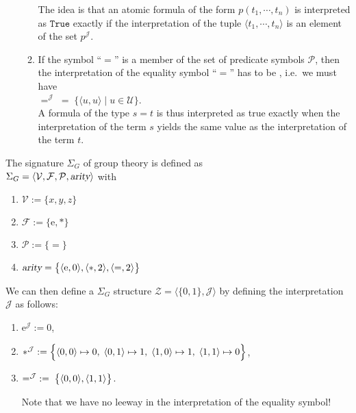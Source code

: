 \begin{Definition}[Structure]
\begin{enumerate}
\begin{enumerate}
              The idea is that an atomic formula of the form $p(t_1, \cdots, t_n)$
              is interpreted as $\texttt{True}$ exactly if the interpretation of the tuple
              $\langle t_1, \cdots, t_n \rangle$ is an element of the set $p^\mathcal{J}$.
        \item If the symbol ``$=$'' is a member of the set of predicate symbols $\mathcal{P}$, then the
              interpretation of  the equality symbol ``$=$'' has to be , i.e.~we must have
              \\[0.2cm]
              \hspace*{1.3cm}  
              $=^\mathcal{J} \;=\; \bigl\{ \langle u, u \rangle \mid u \in \mathcal{U} \bigr\}$.
              \\[0.2cm]
              A formula of the type $s = t$ is thus interpreted as true 
              exactly when the interpretation of the term $s$ yields the same value as the interpretation of
              the term $t$. 
              \eox
        \end{enumerate}
    \end{enumerate}
\end{Definition}

\exampleEng
The signature $\Sigma_G$ of group theory is defined as \\[0.2cm]
\hspace*{1.3cm} $\Sigma_G = \langle \mathcal{V}, \mathcal{F}, \mathcal{P},\textsl{arity}\rangle$ 
\quad with
\begin{enumerate}
\item $\mathcal{V} := \{ x, y, z \}$
\item $\mathcal{F} := \{ \mathrm{e}, * \}$
\item $\mathcal{P} := \{ \mathtt{=} \}$
\item $\textsl{arity} = \bigl\{ \pair(\mathrm{e},0), \pair(*,2), \pair(\mathtt{=},2)\bigr\}$
\end{enumerate}
We can then define a $\Sigma_G$ structure $\mathcal{Z} = \langle \{0,1\},\mathcal{J}\rangle$ 
by defining the interpretation $\mathcal{J}$ 
as follows:
\begin{enumerate}
\item $\mathrm{e}^\mathcal{J} := 0$,
\item $*^\mathcal{J} := \Bigl\{ \pair(0,0) \mapsto 0,\;
                                 \pair(0,1) \mapsto 1,\;
                                 \pair(1,0) \mapsto 1,\;
                                 \pair(1,1) \mapsto 0 \Bigr\}$,
\item $=^\mathcal{J} \;:=\; \bigl\{ \pair(0,0), \pair(1,1) \bigr\}$.
                                 
      Note that we have no leeway in the interpretation of the equality symbol! \eox
\end{enumerate}

